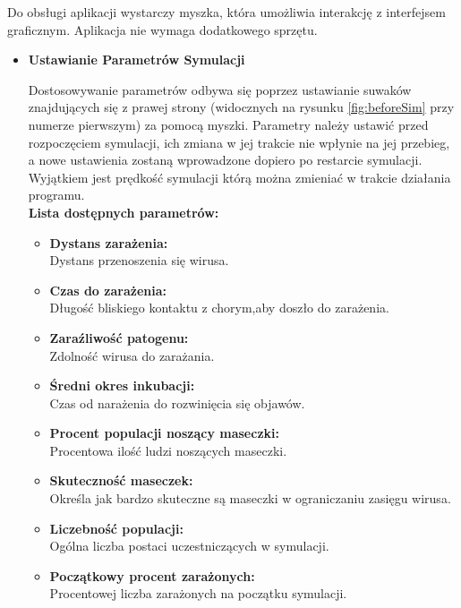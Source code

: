 Do obsługi aplikacji wystarczy myszka, która umożliwia interakcję z interfejsem graficznym. Aplikacja nie wymaga dodatkowego sprzętu.
\begin{itemize}
	\item \textbf{Ustawianie Parametrów Symulacji}
	
	Dostosowywanie parametrów odbywa się poprzez ustawianie suwaków znajdujących się z prawej strony (widocznych na rysunku \ref{fig:beforeSim} przy numerze pierwszym) za pomocą myszki. Parametry należy ustawić przed rozpoczęciem symulacji, ich zmiana w jej trakcie nie wpłynie na jej przebieg, a nowe ustawienia zostaną wprowadzone dopiero po restarcie symulacji. Wyjątkiem jest prędkość symulacji którą można zmieniać w trakcie działania programu.\\
	\textbf{Lista dostępnych parametrów:}
	\begin{itemize}
		\item \textbf{Dystans zarażenia:}\\
		 Dystans przenoszenia się wirusa.
		
		\item \textbf{Czas do zarażenia:}\\
		 Długość bliskiego kontaktu z chorym,aby doszło do zarażenia.

		\item \textbf{Zaraźliwość patogenu:}\\
		 Zdolność wirusa do zarażania.
		
		\item \textbf{Średni okres inkubacji:}\\
		Czas od narażenia do rozwinięcia się objawów.

		\item \textbf{Procent populacji noszący maseczki:}\\
		Procentowa ilość ludzi noszących maseczki.

		\item \textbf{Skuteczność maseczek:}\\
		Określa jak bardzo skuteczne są maseczki w ograniczaniu zasięgu wirusa.
		
		\item \textbf{Liczebność populacji:}\\
		Ogólna liczba postaci uczestniczących w symulacji.
		
		\item \textbf{Początkowy procent zarażonych:}\\
		Procentowej liczba zarażonych na początku symulacji.
		

\end{itemize}
\end{itemize}
